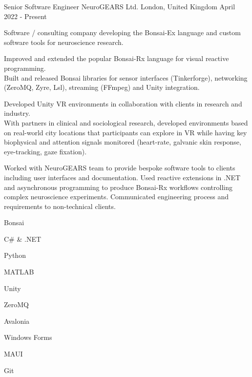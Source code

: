 

\begin{cventries}

  \cventry%
    {Senior Software Engineer} %
    {NeuroGEARS Ltd.} %
    {London, United Kingdom} %
    {April 2022 \-- Present} %
    {
      \begin{cvsentence}Software / consulting company developing the Bonsai-Ex language and custom software tools for neuroscience research.\end{cvsentence}
      \begin{cvitems} %
        \item {Improved and extended the popular Bonsai-Rx language for visual reactive programming.} \\
        Built and released Bonsai libraries for sensor interfaces (Tinkerforge), networking (ZeroMQ, Zyre, Lsl), streaming (FFmpeg) and Unity integration.
        \item {Developed Unity VR environments in collaboration with clients in research and industry.} \\
        With partners in clinical and sociological research, developed environments based on real-world city locations that participants can explore in VR while having key biophysical and attention signals monitored (heart-rate, galvanic skin response, eye-tracking, gaze fixation).
        \item {Worked with NeuroGEARS team to provide bespoke software tools to clients including user interfaces and documentation. Used reactive extensions in .NET and asynchronous programming to produce Bonsai-Rx workflows controlling complex neuroscience experiments. Communicated engineering process and requirements to non-technical clients.}
      \end{cvitems}
    }
    \begin{cventryskills}
      \item Bonsai
      \item C\# \& .NET
      \item Python
      \item MATLAB
      \item Unity
      \item ZeroMQ
      \item Avalonia
      \item Windows Forms
      \item MAUI
      \item Git
    \end{cventryskills}


\end{cventries}
